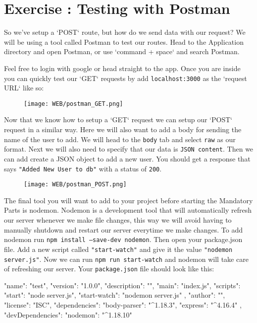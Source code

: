 \documentclass{42-en}
\begin{document}
\chapter{Exercise \exercicenumber: Testing with Postman}

    So we've setup a `POST` route, but how do we send data with our request? We will be using a tool called Postman to test our routes. Head to the Application directory and open Postman, or use  `command + space` and search Postman.

    Feel free to login with google or head straight to the app. Once you are inside you can quickly test our `GET` requests by add \texttt{localhost:3000} as the `request URL` like so:

    \begin{figure}[H]
        \begin{center}
            \texttt{[image: WEB/postman\_GET.png]}
        \end{center}
    \end{figure}

Now that we know how to setup a `GET` request we can setup our `POST` request in a similar way. Here we will also want to add a body for sending the name of the user to add. We will head to the \texttt{body} tab and select \texttt{raw} as our format. Next we will also need to specify that our data is \texttt{JSON content}. Then we can add create a JSON object to add a new user. You should get a response that says \texttt{"Added New User to db"} with a status of \texttt{200}.

    \begin{figure}[H]
        \begin{center}
            \texttt{[image: WEB/postman\_POST.png]}
        \end{center}
    \end{figure}


The final tool you will want to add to your project before starting the Mandatory Parts is nodemon. Nodemon is a development tool that will automatically refresh our server whenever we make file changes, this way we will avoid having to manually shutdown and restart our server everytime we make changes. To add nodemon run \texttt{npm install --save-dev nodemon}. Then open your package.json file. Add a new script called \texttt{"start-watch"} and give it the value \texttt{"nodemon server.js"}. Now we can run \texttt{npm run start-watch} and nodemon will take care of refreshing our server. Your \texttt{package.json} file should look like this:
\begin{42jscode}
{
  "name": "test",
  "version": "1.0.0",
  "description": "",
  "main": "index.js",
  "scripts": {
    "start": "node server.js",
    "start-watch": "nodemon server.js"
  },
  "author": "",
  "license": "ISC",
  "dependencies": {
    "body-parser": "^1.18.3",
    "express": "^4.16.4"
  },
  "devDependencies": {
    "nodemon": "^1.18.10"
  }
}
\end{42jscode}
\end{document}
